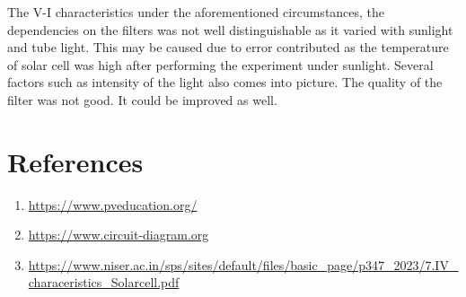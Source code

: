 \documentclass[a4paper, amsfonts, amssymb, amsmath, reprint, showkeys, nofootinbib, twoside]{revtex4-1}
\begin{document}
The V-I characteristics under the aforementioned circumstances, the dependencies on the filters was not well distinguishable as it varied with sunlight and tube light. This may be caused due to error contributed as the temperature of solar cell was high after performing the experiment under sunlight. Several factors such as intensity of the light also comes into picture. The quality of the filter was not good. It could be improved as well. 


\section{References}
\begin{enumerate}
\item{\url{https://www.pveducation.org/}}
\item {\url{https://www.circuit-diagram.org}}
\item {\url{https://www.niser.ac.in/sps/sites/default/files/basic_page/p347_2023/7.IV_characeristics_Solarcell.pdf}}


\end{enumerate}
\end{document}
